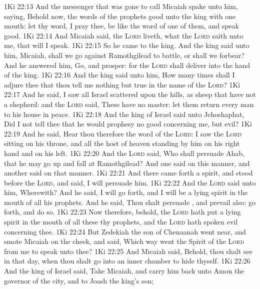 \vs 1Ki 22:13 And the messenger that was gone to call Micaiah spake unto him, saying, Behold now, the words of the prophets  good unto the king with one mouth: let thy word, I pray thee, be like the word of one of them, and speak  good.
\vs 1Ki 22:14 And Micaiah said,  the \textsc{Lord} liveth, what the \textsc{Lord} saith unto me, that will I speak.
\vs 1Ki 22:15 So he came to the king. And the king said unto him, Micaiah, shall we go against Ramothgilead to battle, or shall we forbear? And he answered him, Go, and prosper: for the \textsc{Lord} shall deliver  into the hand of the king.
\vs 1Ki 22:16 And the king said unto him, How many times shall I adjure thee that thou tell me nothing but  true in the name of the \textsc{Lord}?
\vs 1Ki 22:17 And he said, I saw all Israel scattered upon the hills, as sheep that have not a shepherd: and the \textsc{Lord} said, These have no master: let them return every man to his house in peace.
\vs 1Ki 22:18 And the king of Israel said unto Jehoshaphat, Did I not tell thee that he would prophesy no good concerning me, but evil?
\vs 1Ki 22:19 And he said, Hear thou therefore the word of the \textsc{Lord}: I saw the \textsc{Lord} sitting on his throne, and all the host of heaven standing by him on his right hand and on his left.
\vs 1Ki 22:20 And the \textsc{Lord} said, Who shall persuade Ahab, that he may go up and fall at Ramothgilead? And one said on this manner, and another said on that manner.
\vs 1Ki 22:21 And there came forth a spirit, and stood before the \textsc{Lord}, and said, I will persuade him.
\vs 1Ki 22:22 And the \textsc{Lord} said unto him, Wherewith? And he said, I will go forth, and I will be a lying spirit in the mouth of all his prophets. And he said, Thou shalt persuade , and prevail also: go forth, and do so.
\vs 1Ki 22:23 Now therefore, behold, the \textsc{Lord} hath put a lying spirit in the mouth of all these thy prophets, and the \textsc{Lord} hath spoken evil concerning thee.
\vs 1Ki 22:24 But Zedekiah the son of Chenaanah went near, and smote Micaiah on the cheek, and said, Which way went the Spirit of the \textsc{Lord} from me to speak unto thee?
\vs 1Ki 22:25 And Micaiah said, Behold, thou shalt see in that day, when thou shalt go into an inner chamber to hide thyself.
\vs 1Ki 22:26 And the king of Israel said, Take Micaiah, and carry him back unto Amon the governor of the city, and to Joash the king's son;
